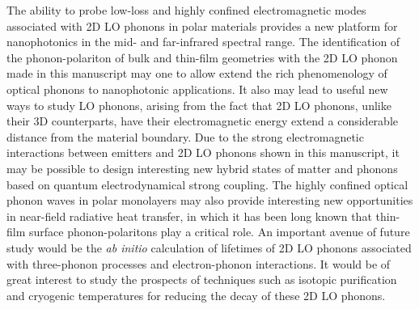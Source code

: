 \documentclass[aps,prb,twocolumn,
	           groupedaddress,superscriptaddress,
               amsfonts,amssymb,amsmath,floatfix,
	           citeautoscript]{revtex4-1}
\begin{document}
The ability to probe low-loss and highly confined electromagnetic modes associated with 2D LO phonons in polar materials provides a new platform for nanophotonics in the mid- and far-infrared spectral range. The identification of the phonon-polariton of bulk and thin-film geometries with the 2D LO phonon made in this manuscript may one to allow extend the rich phenomenology of optical phonons to nanophotonic applications. It also may lead to useful new ways to study LO phonons, arising from the fact that 2D LO phonons, unlike their 3D counterparts, have their electromagnetic energy extend a considerable distance from the material boundary. Due to the strong electromagnetic interactions between emitters and 2D LO phonons shown in this manuscript, it may be possible to design interesting new hybrid states of matter and phonons based on quantum electrodynamical strong coupling. The highly confined optical phonon waves in polar monolayers may also provide interesting new opportunities in near-field radiative heat transfer, in which it has been long known that thin-film surface phonon-polaritons play a critical role. An important avenue of future study would be the \textit{ab initio} calculation of lifetimes of 2D LO phonons associated with three-phonon processes and electron-phonon interactions. It would be of great interest to study the prospects of techniques such as isotopic purification and cryogenic temperatures for reducing the decay of these 2D LO phonons.
\end{document}
